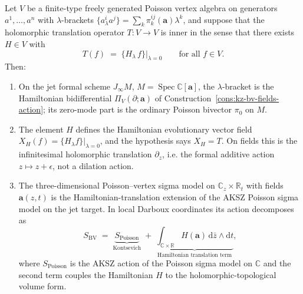 \begin{proposition}%
\label{prop:poisson-hamiltonian}
Let $V$ be a finite-type freely generated Poisson vertex algebra on generators
$a^1,\ldots,a^n$ with $\lambda$-brackets $\{a^i_\lambda a^j\}=
\sum_k \pi^{ij}_k(\boldsymbol a)\lambda^k$, and suppose that the holomorphic
translation operator $T\colon V\to V$ is inner in the sense that there exists
$H\in V$ with
\[
T(f) \;=\; \{H_\lambda\, f\}\big|_{\lambda=0}
\qquad\text{for all } f\in V.
\]
Then:
\begin{enumerate}
\item On the jet formal scheme $J_\infty M$, $M=\operatorname{Spec}\mathbb C[\boldsymbol a]$, the
$\lambda$-bracket is the Hamiltonian bidifferential
$\Pi_V(\partial;\boldsymbol a)$ of Construction~\ref{cons:kz-bv-fields-action}; its zero-mode part is the
ordinary Poisson bivector $\pi_0$ on $M$.
\item The element $H$ defines the Hamiltonian evolutionary vector field
$X_H(f)=\{H_\lambda f\}|_{\lambda=0}$, and the hypothesis says $X_H=T$.
On fields this is the infinitesimal holomorphic translation $\partial_z$, i.e. the formal additive action
$z\mapsto z+\epsilon$, not a dilation action.
\item The three-dimensional Poisson--vertex sigma model on
$\mathbb C_z\times\mathbb R_t$ with fields
$\boldsymbol a(z,t)$ is the Hamiltonian-translation extension of the AKSZ Poisson sigma model on the jet
target. In local Darboux coordinates its action decomposes as
\[
S_{\mathrm{BV}}
\;=\;
\underbrace{S_{\mathrm{Poisson}}}_{\text{Kontsevich}}
\;+\;
\underbrace{\int_{\mathbb C\times\mathbb R}
H(\boldsymbol a)\,\mathrm{d}\bar z\wedge\mathrm{d}t}_{\text{Hamiltonian translation term}},
\]
where $S_{\mathrm{Poisson}}$ is the AKSZ action of the Poisson sigma model on
$\mathbb C$ and the second term couples the Hamiltonian $H$ to the
holomorphic-topological volume form.
\end{enumerate}
\end{proposition}

